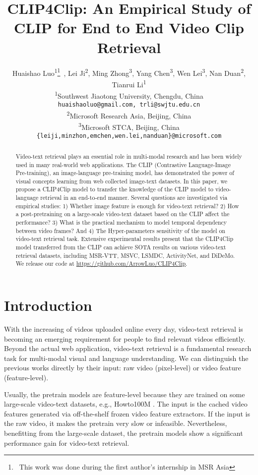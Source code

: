 \documentclass[11pt]{article}
\title{CLIP4Clip: An Empirical Study of CLIP for End to End Video Clip Retrieval}
\author{
	Huaishao Luo\textsuperscript{1}\thanks{~This work was done during the first author's internship in MSR Asia}~,
	Lei Ji\textsuperscript{2},
	Ming Zhong\textsuperscript{3},
	Yang Chen\textsuperscript{3},
	Wen Lei\textsuperscript{3},
	Nan Duan\textsuperscript{2},
	Tianrui Li\textsuperscript{1} \\
	\textsuperscript{1}Southwest Jiaotong University, Chengdu, China\\
	{\tt huaishaoluo@gmail.com, trli@swjtu.edu.cn} \\
	\textsuperscript{2}Microsoft Research Asia, Beijing, China \\ 
	\textsuperscript{3}Microsoft STCA, Beijing, China \\ 
	{\tt \{leiji,minzhon,emchen,wen.lei,nanduan\}@microsoft.com}
}
\begin{document}
	\maketitle
	\begin{abstract}
		Video-text retrieval plays an essential role in multi-modal research and has been widely used in many real-world web applications.  The CLIP (Contrastive Language-Image Pre-training), an image-language pre-training model, has demonstrated the power of visual concepts learning from web collected image-text datasets. In this paper, we propose a CLIP4Clip model to transfer the knowledge of the CLIP model to video-language retrieval in an end-to-end manner. Several questions are investigated via empirical studies: 1) Whether image feature is enough for video-text retrieval? 2) How a post-pretraining on a large-scale video-text dataset based on the CLIP affect the performance? 3) What is the practical mechanism to model temporal dependency between video frames? And 4) The Hyper-parameters sensitivity of the model on video-text retrieval task. Extensive experimental results present that the CLIP4Clip model transferred from the CLIP can achieve SOTA results on various video-text retrieval datasets, including MSR-VTT, MSVC, LSMDC, ActivityNet, and DiDeMo. We release our code at \url{https://github.com/ArrowLuo/CLIP4Clip}.
	\end{abstract}

	\section{Introduction}
	With the increasing of videos uploaded online every day, video-text retrieval is becoming an emerging requirement for people to find relevant videos efficiently. Beyond the actual web application, video-text retrieval is a fundamental research task for multi-modal visual and language understanding. We can distinguish the previous works directly by their input: raw video (pixel-level) or video feature (feature-level).

	Usually, the pretrain models \cite{Zhu_2020_CVPR,Luo2020UniVL,Li2020HERO,Gabeur2020MMT,patrick2021supportset,Rouditchenko2020} are feature-level because they are trained on some large-scale video-text datasets, e.g., Howto100M \cite{miech2019howto100m}. The input is the cached video features generated via off-the-shelf frozen video feature extractors. If the input is the raw video, it makes the pretrain very slow or infeasible. Nevertheless, benefitting from the large-scale dataset, the pretrain models show a significant performance gain for video-text retrieval.
\end{document}

